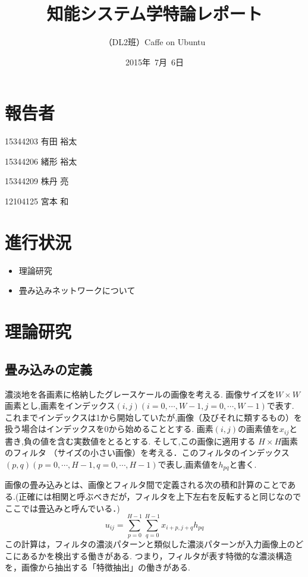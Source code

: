 \documentclass[a4paper,10pt]{jsarticle}
\title{知能システム学特論レポート}
\author{
（DL2班）Caffe on Ubuntu\\
}
\date{2015年\ 7月\ 6日}
\begin{document}
\maketitle
\section{報告者}
\begin{list}{}{}
 \item 15344203\hspace{0.5cm} 有田 裕太
 \item 15344206\hspace{0.5cm} 緒形 裕太
 \item 15344209\hspace{0.5cm} 株丹 亮
 \item 12104125\hspace{0.5cm} 宮本 和
\end{list}

\section{進行状況}

\begin{itemize}
\item 理論研究
\item 畳み込みネットワークについて
\end{itemize}

\section{理論研究}

\subsection{畳み込みの定義}

濃淡地を各画素に格納したグレースケールの画像を考える.
画像サイズを$W\times W$画素とし,画素をインデックス$(i,j)(i = 0,\cdots,W-1, j = 0,\cdots,W-1)$で表す.
これまでインデックスは1から開始していたが,画像（及びそれに類するもの）を扱う場合はインデックスを0から始めることとする.
画素$(i,j)$の画素値を$x_{ij}$と書き,負の値を含む実数値をとるとする.
そして,この画像に適用する $H\times H$画素のフィルタ
（サイズの小さい画像）を考える．このフィルタのインデックス$(p,q)(p=0,\cdots,H-1, q=0,\cdots,H-1)$で表し,画素値を$h_{pq}$と書く.

画像の畳み込みとは、画像とフィルタ間で定義される次の積和計算のことである.(正確には相関と呼ぶべきだが，フィルタを上下左右を反転すると同じなのでここでは畳込みと呼んでいる．)
\begin{equation}
  u_{ij} = \sum_{p=0}^{H-1} \sum_{q=0}^{H-1} x_{i+p,j+q} h_{pq}
\end{equation}
この計算は，フィルタの濃淡パターンと類似した濃淡パターンが入力画像上のどこにあるかを検出する働きがある.
つまり，フィルタが表す特徴的な濃淡構造を，画像から抽出する「特徴抽出」の働きがある.
\end{document}
